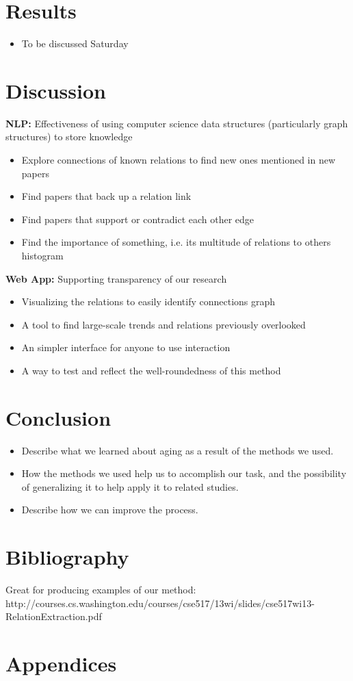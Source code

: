 \documentclass[11pt]{article}
\begin{document}
\begin{itemize}
\section{Results}

\begin{itemize}
	\item To be discussed Saturday
\end{itemize}

\section{Discussion}

\textbf{NLP:} Effectiveness of using computer science data structures (particularly graph structures) to store knowledge

\begin{itemize}
\item Explore connections of known relations to find new ones mentioned in new papers
\item Find papers that back up a relation link
\item Find papers that support or contradict each other edge
\item Find the importance of something, i.e. its multitude of relations to others histogram
\end{itemize}

\textbf{Web App:} Supporting transparency of our research

\begin{itemize}
\item Visualizing the relations to easily identify connections graph
\item A tool to find large-scale trends and relations previously overlooked
\item An simpler interface for anyone to use interaction
\item A way to test and reflect the well-roundedness of this method\end{itemize}
\end{itemize}

\section{Conclusion}
\begin{itemize}
\item Describe what we learned about aging as a result of the methods we used.
\item How the methods we used help us to accomplish our task, and the possibility of generalizing it to help apply it to related studies.
\item Describe how we can improve the process.
\end{itemize}

\section{Bibliography}

Great for producing examples of our method:
http://courses.cs.washington.edu/courses/cse517/13wi/slides/cse517wi13-RelationExtraction.pdf


\section{Appendices}
\end{document}
